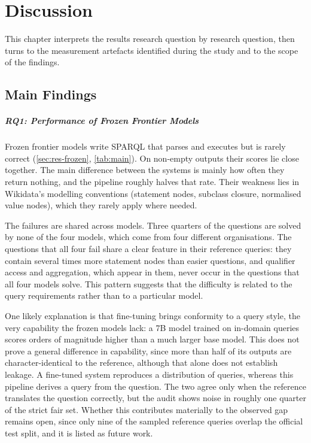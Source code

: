 \chapter{Discussion}

\label{ch:discussion}

This chapter interprets the results research question by research question, then turns to the measurement artefacts identified during the study and to the scope of the findings.

\section{Main Findings}

\paragraph{RQ1: Performance of Frozen Frontier Models}

\label{sec:disc-rq1}

Frozen frontier models write SPARQL that parses and executes but is rarely correct (\cref{sec:res-frozen}, \cref{tab:main}).
On non-empty outputs their scores lie close together.
The main difference between the systems is mainly how often they return nothing, and the pipeline roughly halves that rate.
Their weakness lies in Wikidata's modelling conventions (statement nodes, subclass closure, normalised value nodes), which they rarely apply where needed.

The failures are shared across models.
Three quarters of the questions are solved by none of the four models, which come from four different organisations.
The questions that all four fail share a clear feature in their reference queries: they contain several times more statement nodes than easier questions, and qualifier access and aggregation, which appear in them, never occur in the questions that all four models solve.
This pattern suggests that the difficulty is related to the query requirements rather than to a particular model.

One likely explanation is that fine-tuning brings conformity to a query style, the very capability the frozen models lack: a 7B model trained on in-domain queries scores orders of magnitude higher than a much larger base model.
This does not prove a general difference in capability, since more than half of its outputs are character-identical to the reference, although that alone does not establish leakage.
A fine-tuned system reproduces a distribution of queries, whereas this pipeline derives a query from the question. The two agree only when the reference translates the question correctly, but the audit shows noise in roughly one quarter of the strict fair set.
Whether this contributes materially to the observed gap remains open, since only nine of the sampled reference queries overlap the official test split, and it is listed as future work.

